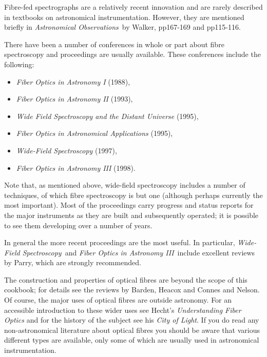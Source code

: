 \documentclass[twoside,11pt]{article}
\newcommand{\htmladdnormallink}[2]{#1}
\begin{document}
Fibre-fed spectrographs are a relatively recent innovation and are
rarely described in textbooks on astronomical instrumentation.  However,
they are mentioned briefly in {\it Astronomical Observations}\, by
Walker\cite{WALKER87}, pp167-169 and pp115-116.

There have been a number of conferences in whole or part about fibre
spectroscopy and proceedings are usually available.  These conferences
include the following:

\begin{itemize}

  \item {\it Fiber Optics in Astronomy I}\/\cite{BARDEN88} (1988),

  \item {\it Fiber Optics in Astronomy II}\/\cite{GRAY93} (1993),

  \item {\it Wide Field Spectroscopy and the Distant
   Universe}\/\cite{MADDOX95} (1995),

  \item {\it Fiber Optics in Astronomical Applications}\/\cite{BARDEN95}
   (1995),

  \item {\it Wide-Field Spectroscopy}\/\cite{KONTIZAS97} (1997),

  \item {\it Fiber Optics in Astronomy III}\/\cite{ARRIBAS98} (1998).

\end{itemize}

Note that, as mentioned above,  wide-field spectroscopy includes a number
of techniques, of which fibre spectroscopy is but one (although perhaps
currently the most important).  Most of the proceedings carry progress
and status reports for the major instruments as they are built and
subsequently operated; it is possible to see them developing over a number
of years.

In general the more recent proceedings are the most useful.  In
particular, {\it Wide-Field Spectroscopy}\, and {\it Fiber Optics in
Astronomy III}\, include excellent reviews by Parry\cite{PARRY97,
PARRY98}, which are strongly recommended.

The construction and properties of optical fibres are beyond the scope
of this cookbook; for details see the reviews by Barden\cite{BARDEN98},
Heacox and Connes\cite{HEACOX92} and Nelson\cite{NELSON88}.  Of course,
the major uses of optical fibres are outside astronomy.  For an
accessible introduction to these wider uses see 
\htmladdnormallink{Hecht's}{http://www.sff.net/people/Jeff.Hecht/}
\htmladdnormallink{{\it Understanding Fiber Optics}}
{http://www.sff.net/people/jeff.hecht/UFO.html}\/\cite{HECHT98} 
and for the 
\htmladdnormallink{history}{http://www.sff.net/people/Jeff.Hecht/history.html}
of the subject see his 
\htmladdnormallink{{\it City of Light}}
{http://www.sff.net/people/Jeff.Hecht/City.html}\/\cite{HECHT99}.
If you do read any non-astronomical literature about optical fibres
you should be aware that various different types are available, only
some of which are usually used in astronomical instrumentation.
\end{document}
